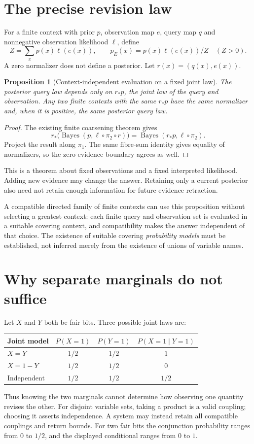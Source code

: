 \documentclass[11pt]{article}
\newtheorem{proposition}{Proposition}
\begin{document}
\section{The precise revision law}
For a finite context with prior $p$, observation map $e$, query map $q$ and
nonnegative observation likelihood $\ell$, define
\[
 Z=\sum_x p(x)\ell(e(x)),\qquad
 p_E(x)=p(x)\ell(e(x))/Z \quad (Z>0).
\]
A zero normalizer does not define a posterior. Let $r(x)=(q(x),e(x))$.
\begin{proposition}[Context-independent evaluation on a fixed joint law]
The posterior query law depends only on $r_*p$, the joint law of the query
and observation. Any two finite contexts with the same $r_*p$ have the same
normalizer and, when it is positive, the same posterior query law.
\end{proposition}
\begin{proof}
The existing finite coarsening theorem gives
\[
 r_*\bigl(\operatorname{Bayes}(p,\ell\circ\pi_2\circ r)\bigr)
 =\operatorname{Bayes}(r_*p,\ell\circ\pi_2).
\]
Project the result along $\pi_1$. The same fibre-sum identity gives equality
of normalizers, so the zero-evidence boundary agrees as well.
\end{proof}
This is a theorem about fixed observations and a fixed interpreted likelihood.
Adding new evidence may change the answer. Retaining only a current posterior
also need not retain enough information for future evidence retraction.

A compatible directed family of finite contexts can use this proposition
without selecting a greatest context: each finite query and observation set
is evaluated in a suitable covering context, and compatibility makes the
answer independent of that choice. The existence of suitable covering
\emph{probability models} must be established, not inferred merely from the
existence of unions of variable names.

\section{Why separate marginals do not suffice}
Let $X$ and $Y$ both be fair bits. Three possible joint laws are:
\begin{center}
\begin{tabular}{lccc}
\toprule
Joint model & $P(X=1)$ & $P(Y=1)$ & $P(X=1\mid Y=1)$\\
\midrule
$X=Y$ & $1/2$ & $1/2$ & $1$\\
$X=1-Y$ & $1/2$ & $1/2$ & $0$\\
Independent & $1/2$ & $1/2$ & $1/2$\\
\bottomrule
\end{tabular}
\end{center}
Thus knowing the two marginals cannot determine how observing one quantity
revises the other. For disjoint variable sets, taking a product is a valid
coupling; choosing it asserts independence. A system may instead retain all
compatible couplings and return bounds. For two fair bits the conjunction
probability ranges from $0$ to $1/2$, and the displayed conditional ranges
from $0$ to $1$.
\end{document}

